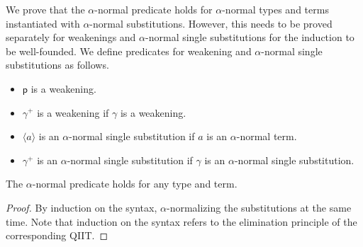 \documentclass[sigplan,10pt,anonymous,review]{acmart}\settopmatter{printfolios=true,printccs=false,printacmref=false}
\newcommand{\p}{\mathsf{p}}
\begin{document}
We prove that the $\alpha$-normal predicate holds for $\alpha$-normal types and
terms instantiated with $\alpha$-normal substitutions. However, this needs to be
proved separately for weakenings and $\alpha$-normal single substitutions for
the induction to be well-founded. We define predicates for weakening and
$\alpha$-normal single substitutions as follows.
\begin{itemize}
  \item $\p$ is a weakening.
  \item $\gamma^+$ is a weakening if $\gamma$ is a weakening.
  \item $\langle a \rangle$ is an $\alpha$-normal single substitution if $a$ is an
  $\alpha$-normal term.
  \item $\gamma^+$ is an $\alpha$-normal single substitution if $\gamma$ is an
  $\alpha$-normal single substitution.
\end{itemize}

\begin{lemma}
  \label{thm:alpha}
  The $\alpha$-normal predicate holds for any type and term.
\end{lemma}
\begin{proof}
  By induction on the syntax, $\alpha$-normalizing the substitutions
  at the same time. Note that induction on the syntax refers to the
  elimination principle of the corresponding QIIT.
\end{proof}
\end{document}

